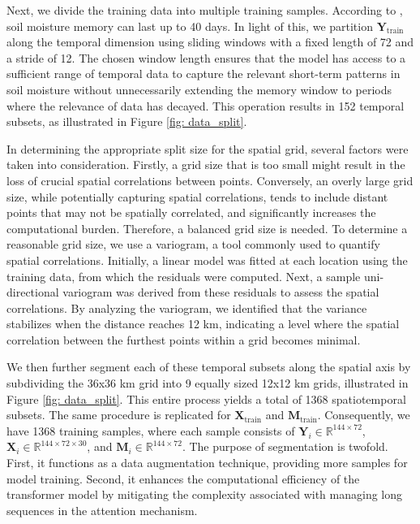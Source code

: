 \documentclass[11pt]{article}
\begin{document}
Next, we divide the training data into multiple training samples. According to \citet{orth2012analysis}, soil moisture memory can last up to 40 days. In light of this, we partition $\boldsymbol{Y}_{\text{train}}$ along the temporal dimension using sliding windows with a fixed length of 72 and a stride of 12.  The chosen window length ensures that the model has access to a sufficient range of temporal data to capture the relevant short-term patterns in soil moisture without unnecessarily extending the memory window to periods where the relevance of data has decayed. This operation results in 152 temporal subsets, as illustrated in Figure \ref{fig: data_split}.

In determining the appropriate split size for the spatial grid, several factors were taken into consideration. Firstly, a grid size that is too small might result in the loss of crucial spatial correlations between points. Conversely, an overly large grid size, while potentially capturing spatial correlations, tends to include distant points that may not be spatially correlated, and significantly increases the computational burden. Therefore, a balanced grid size is needed. To determine a reasonable grid size, we use a variogram, a tool commonly used to quantify spatial correlations. Initially, a linear model was fitted at each location using the training data, from which the residuals were computed. Next, a sample uni-directional variogram was derived from these residuals to assess the spatial correlations. By analyzing the variogram, we identified that the variance stabilizes when the distance reaches 12 km, indicating a level where the spatial correlation between the furthest points within a grid becomes minimal.

We then further segment each of these temporal subsets along the spatial axis by subdividing the 36x36 km grid into 9 equally sized 12x12 km grids, illustrated in Figure \ref{fig: data_split}. This entire process yields a total of 1368 spatiotemporal subsets. The same procedure is replicated for $\boldsymbol{X}_{\text{train}}$ and $\boldsymbol{M}_{\text{train}}$. Consequently, we have 1368 training samples, where each sample consists of $\boldsymbol{Y}_i \in \mathbb{R}^{144\times 72}$, $\boldsymbol{X}_i \in \mathbb{R}^{144 \times 72 \times 30}$, and $\boldsymbol{M}_i \in \mathbb{R}^{144 \times 72}$. The purpose of segmentation is twofold. First, it functions as a data augmentation technique, providing more samples for model training. Second, it enhances the computational efficiency of the transformer model by mitigating the complexity associated with managing long sequences in the attention mechanism. 
\end{document}
